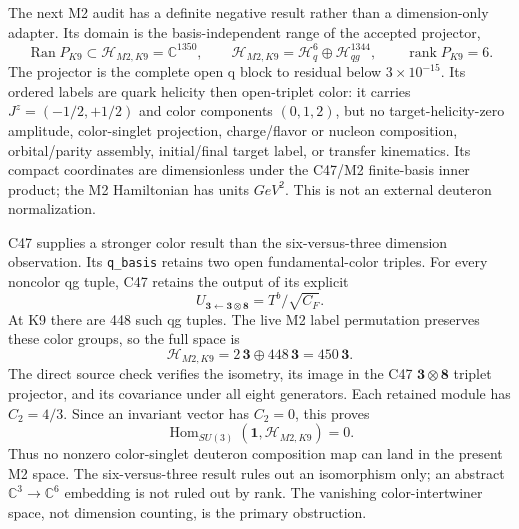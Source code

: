 \documentclass[11pt,oneside]{book}
\newcommand{\codepath}[1]{\nolinkurl{#1}}
\begin{document}
The next M2 audit has a definite negative result rather than a dimension-only
adapter. Its domain is the basis-independent range of the accepted projector,
\begin{equation}
 \operatorname{Ran}P_{K9}\subset\mathcal H_{M2,K9}=\mathbb C^{1350},
 \qquad \mathcal H_{M2,K9}=\mathcal H_q^6\oplus\mathcal H_{qg}^{1344},
 \qquad \operatorname{rank}P_{K9}=6.
 \label{eq:m2-current-domain}
\end{equation}
The projector is the complete open q block to residual below
$3\times10^{-15}$. Its ordered labels are quark helicity then open-triplet
color: it carries $J^z=(-1/2,+1/2)$ and color components $(0,1,2)$, but no
target-helicity-zero amplitude, color-singlet projection, charge/flavor or
nucleon composition, orbital/parity assembly, initial/final target label, or
transfer kinematics. Its compact coordinates are dimensionless under the
C47/M2 finite-basis inner product; the M2 Hamiltonian has units
$\unit{GeV^2}$. This is not an external deuteron normalization.

C47 supplies a stronger color result than the six-versus-three dimension
observation. Its \codepath{q\_basis} retains two open fundamental-color
triples. For every noncolor qg tuple, C47 retains the output of its explicit
\begin{equation}
 U_{\mathbf3\leftarrow\mathbf3\otimes\mathbf8}
 =T^b/\sqrt{C_F}.
 \label{eq:m2-c47-triplet-isometry}
\end{equation}
At K9 there are 448 such qg tuples. The live M2 label permutation preserves
these color groups, so the full space is
\begin{equation}
 \mathcal H_{M2,K9}=2\,\mathbf3\oplus448\,\mathbf3
 =450\,\mathbf3.
 \label{eq:m2-fundamental-only-decomposition}
\end{equation}
The direct source check verifies the isometry, its image in the C47
$\mathbf3\otimes\mathbf8$ triplet projector, and its covariance under all
eight generators. Each retained module has $C_2=4/3$. Since an invariant
vector has $C_2=0$, this proves
\begin{equation}
 \operatorname{Hom}_{SU(3)}\!\left(\mathbf1,\mathcal H_{M2,K9}\right)=0.
 \label{eq:m2-no-color-singlet}
\end{equation}
Thus no nonzero color-singlet deuteron composition map can land in the
present M2 space. The six-versus-three result rules out an isomorphism only;
an abstract $\mathbb C^3\to\mathbb C^6$ embedding is not ruled out by rank.
The vanishing color-intertwiner space, not dimension counting, is the primary
obstruction.
\end{document}
